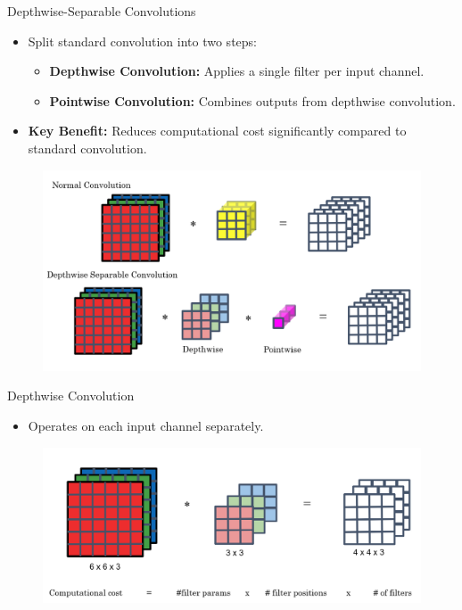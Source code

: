\begin{frame}{Depthwise-Separable Convolutions}
    \begin{itemize}
        \item Split standard convolution into two steps:
        \begin{itemize}
            \item \textbf{Depthwise Convolution:} Applies a single filter per input channel.
            \item \textbf{Pointwise Convolution:} Combines outputs from depthwise convolution.
        \end{itemize}
        \item \textbf{Key Benefit:} Reduces computational cost significantly compared to standard convolution.
    \end{itemize}
    \begin{figure}
        \centering
        \includegraphics[width=0.8\linewidth]{images/cnn/Depth_vs_Normal_Conv.png} 
    \end{figure}
\end{frame}

\begin{frame}{Depthwise Convolution}
    \begin{itemize}
        \item Operates on each input channel separately.
    \end{itemize}
    \begin{figure}
        \centering
        \includegraphics[width=0.8\linewidth]{images/cnn/Depthwise_conv.png}
    \end{figure}
\end{frame}


